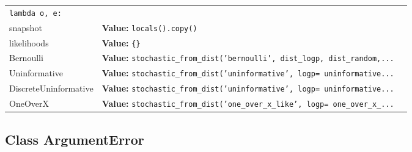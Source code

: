 \begin{longtable}{|p{}|p{}|l}
{\tt lambda o, e:}&\\
\cline{1-2}
\raggedright s\-n\-a\-p\-s\-h\-o\-t\- & \raggedright \textbf{Value:} 
{\tt locals().copy()}&\\
\cline{1-2}
\raggedright l\-i\-k\-e\-l\-i\-h\-o\-o\-d\-s\- & \raggedright \textbf{Value:} 
{\tt \{\}}&\\
\cline{1-2}
\raggedright B\-e\-r\-n\-o\-u\-l\-l\-i\- & \raggedright \textbf{Value:} 
{\tt stochastic\_from\_dist('bernoulli', dist\_logp, dist\_random,\texttt{...}}&\\
\cline{1-2}
\raggedright U\-n\-i\-n\-f\-o\-r\-m\-a\-t\-i\-v\-e\- & \raggedright \textbf{Value:} 
{\tt stochastic\_from\_dist('uninformative', logp= uninformative\texttt{...}}&\\
\cline{1-2}
\raggedright D\-i\-s\-c\-r\-e\-t\-e\-U\-n\-i\-n\-f\-o\-r\-m\-a\-t\-i\-v\-e\- & \raggedright \textbf{Value:} 
{\tt stochastic\_from\_dist('uninformative', logp= uninformative\texttt{...}}&\\
\cline{1-2}
\raggedright O\-n\-e\-O\-v\-e\-r\-X\- & \raggedright \textbf{Value:} 
{\tt stochastic\_from\_dist('one\_over\_x\_like', logp= one\_over\_x\_\texttt{...}}&\\
\cline{1-2}
\end{longtable}



\subsection{Class ArgumentError}


